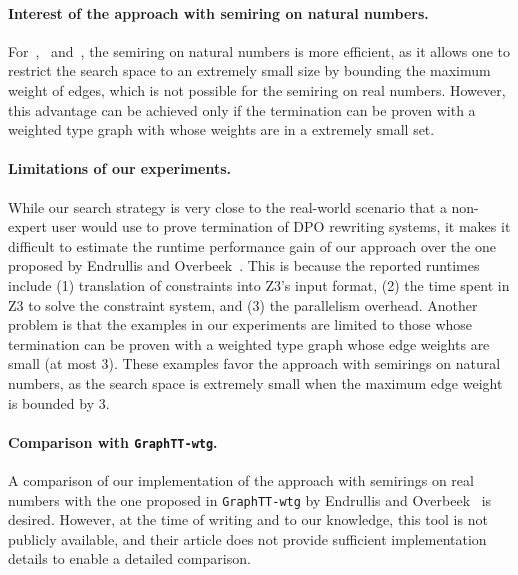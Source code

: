  \paragraph{Interest of the approach with semiring on natural numbers.}
For~\cite[Example 4]{plump2018modular},~\cite[Example 5 and 6]{bruggink2015proving} and~\cite[Example 5]{bruggink2014termination}, the semiring on natural numbers is more efficient, as it allows one to restrict the search space to an extremely small size by bounding the maximum weight of edges, which is not possible for the semiring on real numbers. However, this advantage can be achieved only if the termination can be proven with a weighted type graph with whose weights are in a extremely small set.
\paragraph{Limitations of our experiments.} 
While our search strategy is very close to the real-world scenario that a non-expert user would use to prove termination of DPO rewriting systems, 
it makes it difficult to estimate the runtime performance gain of our approach over the one proposed by Endrullis and Overbeek~\cite{endrullis2024generalized_arxiv_v2}.  
This is because the reported runtimes include (1) translation of constraints into Z3's input format, (2) the time spent in Z3 to solve the constraint system, and (3) the parallelism overhead. 
Another problem is that the examples in our experiments are limited to those whose termination can be proven with a weighted type graph whose edge weights are small (at most 3). These examples favor the approach with semirings on natural numbers, as the search space is extremely small when the maximum edge weight is bounded by 3.
\paragraph{Comparison with \texttt{GraphTT-wtg}.}
A comparison of our implementation of the approach with semirings on real numbers with the one proposed in \texttt{GraphTT-wtg} by Endrullis and Overbeek~\cite{endrullis2024generalized_arxiv_v3} is desired. However, at the time of writing and to our knowledge, this tool is not publicly available,
and their article does not provide sufficient implementation details to enable a detailed comparison.
